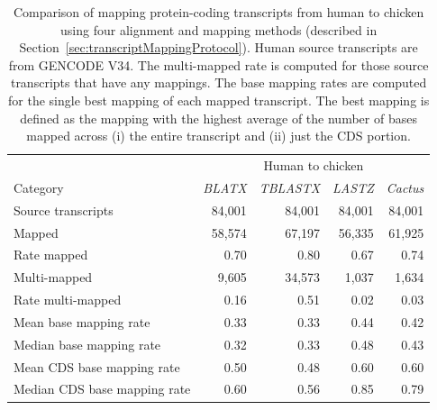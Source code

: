 \documentclass{article}
\newcommand{\secref}[1]{Section~\ref{#1}}
\begin{document}
\clearpage
\begin{table}[!htb]
\begin{center}
\begin{tabular}{l|r|r|r|r}
\multicolumn{1}{c}{} & \multicolumn{4}{c}{Human to chicken} \\
\cmidrule{2-5}
Category                     & \textit{BLATX} & \textit{TBLASTX} & \textit{LASTZ} & \textit{Cactus} \\
\midrule
Source transcripts           & 84,001         & 84,001           & 84,001         & 84,001          \\
Mapped                       & 58,574         & 67,197           & 56,335         & 61,925          \\
Rate mapped                  & 0.70           & 0.80             & 0.67           & 0.74            \\
Multi-mapped                 & 9,605          & 34,573           & 1,037          & 1,634            \\
Rate multi-mapped            & 0.16           & 0.51             & 0.02           & 0.03            \\
Mean base mapping rate       & 0.33           & 0.33             & 0.44           & 0.42            \\
Median base mapping rate     & 0.32           & 0.33             & 0.48           & 0.43            \\
Mean CDS base mapping rate   & 0.50           & 0.48             & 0.60           & 0.60            \\
Median CDS base mapping rate & 0.60           & 0.56             & 0.85           & 0.79            \\
\end{tabular}
\caption{Comparison of mapping protein-coding transcripts from human to chicken
  using four alignment and mapping methods (described in \secref{sec:transcriptMappingProtocol}).  Human source
  transcripts are from GENCODE V34.
  The multi-mapped rate is computed for those source transcripts that
  have any mappings.  The base mapping rates are computed for the single best
  mapping of each mapped transcript.  
  The best mapping is defined as the mapping with the highest average of the number of bases mapped across (i) the entire transcript and (ii) just the CDS portion.
}\label{tab:humanChickenTranscriptMappingStats}
\end{center}
\end{table}
\end{document}
